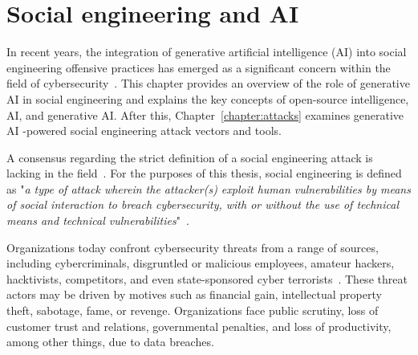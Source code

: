 \chapter{Social engineering and AI\label{chapter:background}}
\begin{comment}
\end{comment}


%
%
In recent years, the integration of generative artificial intelligence (AI) into social engineering offensive practices has emerged as a significant concern within the field of cybersecurity~\citep{blauth_AI_Crime_Overview_Malicious_Use_Abuse_2022, king_AI_Crime_Interdisciplinary_Analysis_2019, mirsky_Threat_Offensive_AI_Organizations_2023}. This chapter provides an overview of the role of generative AI in social engineering and explains the key concepts of open-source intelligence, AI, and generative AI. After this, Chapter~\ref{chapter:attacks} examines generative AI -powered social engineering attack vectors and tools.



%
%
A consensus regarding the strict definition of a social engineering attack is lacking in the field~\citep{hatfield_SE_Evolution_Concept_2018}. For the purposes of this thesis, social engineering is defined as "\textit{a type of attack wherein the attacker(s) exploit human vulnerabilities by means of social interaction to breach cybersecurity, with or without the use of technical means and technical vulnerabilities}"~\citep{wang_Defining_Social_Engineering_2020}.



%
%
Organizations today confront cybersecurity threats from a range of sources, including cybercriminals, disgruntled or malicious employees, amateur hackers, hacktivists, competitors, and even state-sponsored cyber terrorists~\citep{mirsky_Threat_Offensive_AI_Organizations_2023}. These threat actors may be driven by motives such as financial gain, intellectual property theft, sabotage, fame, or revenge. Organizations face public scrutiny, loss of customer trust and relations, governmental penalties, and loss of productivity, among other things, due to data breaches.


